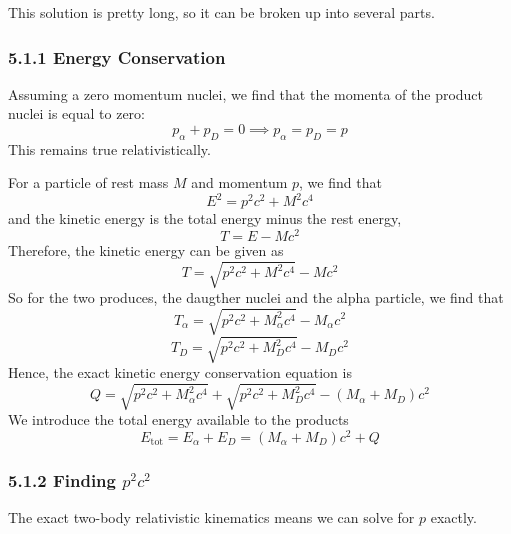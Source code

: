 \documentclass[12pt,a4paper]{article}
\begin{document}
	\begin{solution_pset}
		This solution is pretty long, so it can be 
		broken up into several parts.
		\subsubsection*{5.1.1 Energy Conservation}
			Assuming a zero momentum nuclei, we find that the momenta
			of the product nuclei is equal to zero:
			\[
				p_\alpha + p_D = 0 \implies p_\alpha = p_D = p
			\]
			This remains true relativistically. 

			For a particle of rest mass $M$ and momentum $p$, we find that
			\begin{equation}
				\label{eq:energyrelativistic}
				E^2 = p^2 c^2 + M^2 c^4 
			\end{equation}
			and the kinetic energy is the total energy minus the rest energy,
			\[
				T = E - Mc^2
			\]
			Therefore, the kinetic energy can be given as 
			\[
				T = \sqrt{p^2 c^2 + M^2 c^4} - Mc^2
			\]
			So for the two produces, the daugther nuclei and the alpha particle, we find
			that
			\begin{equation}
				\label{eq:t_alpha}
				T_\alpha = 
				\sqrt{p^2 c^2 + M_\alpha^2 c^4} - M_\alpha c^2
			\end{equation}
			\begin{equation}
				\label{eq:t_d}
				T_D = 
				\sqrt{p^2 c^2 + M_D^2 c^4} - M_D c^2
			\end{equation}
			Hence, the exact kinetic energy conservation equation is
			\begin{equation}
				\label{eq:Qval}
				Q = 
				\sqrt{p^2 c^2 + M_\alpha^2 c^4}  + 
				\sqrt{p^2 c^2 + M_D^2 c^4} -
				(M_\alpha + M_D) c^2
			\end{equation}
			We introduce the total energy available to the products
			\begin{equation}
				\label{eq:E_tot}
				E_\text{tot} = E_\alpha + E_D =  (M_\alpha + M_D)c^2 + Q
			\end{equation}
		\subsubsection*{5.1.2 Finding $p^2c^2$}
			The exact two-body relativistic kinematics means we can solve for $p$ exactly.


\end{solution_pset}
\end{document}
